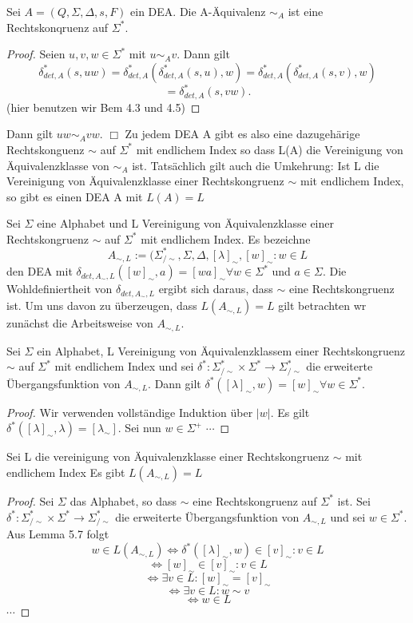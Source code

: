 Sei $A = (Q, \Sigma, \Delta, s, F)$ ein DEA. Die A-Äquivalenz $\sim_{A}$ ist eine Rechtskonqruenz auf $\Sigma^{*}$.
\begin{proof}
  Seien $u, v, w \in \Sigma^{*}$ mit $u \sim_{A} v$. Dann gilt 
  \[\delta_{det, A}^{*}(s, uw) = \delta_{det,A}^{*}(\delta_{det,A}^{*}(s, u), w) = \delta_{det,A}^{*}(\delta_{det,A}^{*}(s,v), w)\]
  \[= \delta_{det,A}^{*}(s, vw).\] (hier benutzen wir Bem 4.3 und 4.5)    
\end{proof} Dann gilt $uw\sim_{A}vw.$
$\Box $
Zu jedem DEA A gibt es also eine dazugehärige Rechtskonguenz $\sim$ auf $\Sigma^{*}$ mit endlichem Index so dass L(A) die Vereinigung von Äquivalenzklasse von $\sim_{A}$ ist. Tatsächlich gilt auch die Umkehrung: Ist L die Vereinigung von Äquivalenzklasse einer Rechtskongruenz $\sim$ mit endlichem Index, so gibt es einen DEA A mit $L(A) = L$

 Sei $\Sigma$ eine Alphabet und L Vereinigung von Äquivalenzklasse einer Rechtskongruenz $\sim$ auf $\Sigma^{*}$ mit endlichem Index. Es bezeichne
\[A_{\sim , L} := (\Sigma^{*}_{/\sim}, \Sigma, \Delta, [\lambda]_{\sim}, {[w]_{\sim} : w \in L}\]
den DEA mit $\delta_{det, A_{\sim}, L}([w]_{\sim}, a) = [wa]_{\sim} \forall w \in \Sigma^{*}$ und $a \in \Sigma$. Die Wohldefiniertheit von $\delta_{det, A_{\sim}, L}$ ergibt sich daraus, dass $\sim$ eine Rechtskongruenz ist. Um uns davon zu überzeugen, dass $L(A_{\sim, L}) = L$ gilt betrachten wr zunächst die Arbeitsweise von $A_{\sim, L}$.

 Sei $\Sigma$ ein Alphabet, L Vereinigung von Äquivalenzklassem einer Rechtskongruenz $\sim$ auf $\Sigma^{*}$ mit endlichem Index und sei $\delta^{*} : \Sigma^{*}_{/\sim} \times \Sigma^{*} \rightarrow \Sigma^{*}_{/\sim}$ die erweiterte Übergangsfunktion von $A_{\sim, L}$. Dann gilt $\delta^{*}([\lambda]_{\sim}, w) = [w]_{\sim} \forall w \in \Sigma^{*}$. 
\begin{proof}
  Wir verwenden vollständige Induktion über $|w|$. Es gilt $\delta^{*}([\lambda]_{\sim}, \lambda) = [\lambda_{\sim}]$. Sei nun $w \in \Sigma^{+}$ $\cdots$  
\end{proof}

 Sei L die vereinigung von Äquivalenzklasse einer Rechtskongruenz $\sim$ mit endlichem Index Es gibt $L(A_{\sim, L}) = L$ 
\begin{proof}
  Sei $\Sigma$ das Alphabet, so dass $\sim$ eine Rechtskongruenz auf $\Sigma^{*}$ ist. Sei $\delta^{*} : \Sigma^{*}_{/\sim} \times \Sigma^{*} \rightarrow \Sigma^{*}_{/\sim}$ die erweiterte Übergangsfunktion von $A_{\sim, L}$ und sei $w \in \Sigma^{*}$. Aus Lemma 5.7 folgt 
  \[w \in L(A_{\sim, L}) \Leftrightarrow \delta^{*}([\lambda]_{\sim}, w) \in {[v]_{\sim} : v \in L}\]
  \[\Leftrightarrow [w]_{\sim} \in {[v]_{\sim} : v\in L}\]
  \[\Leftrightarrow \exists v \in L : [w]_{\sim} = [v]_{\sim}\]
  \[\Leftrightarrow \exists v \in L : w \sim v\]
  \[\Leftrightarrow w \in L\]
  $\cdots$    
\end{proof}

